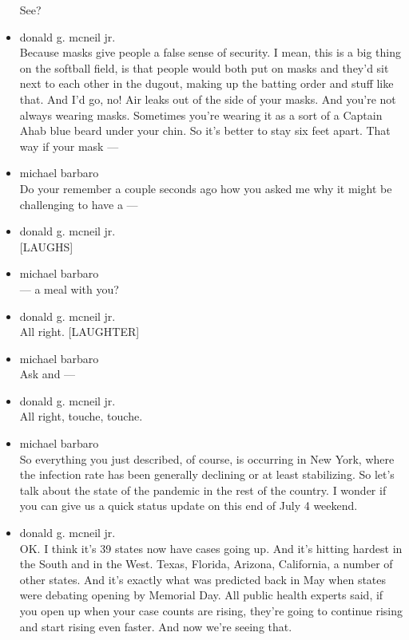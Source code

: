 \begin{itemize}
  See?
\item
  donald g. mcneil jr.\\
  Because masks give people a false sense of security. I mean, this is a
  big thing on the softball field, is that people would both put on
  masks and they'd sit next to each other in the dugout, making up the
  batting order and stuff like that. And I'd go, no! Air leaks out of
  the side of your masks. And you're not always wearing masks. Sometimes
  you're wearing it as a sort of a Captain Ahab blue beard under your
  chin. So it's better to stay six feet apart. That way if your mask ---
\item
  michael barbaro\\
  Do your remember a couple seconds ago how you asked me why it might be
  challenging to have a ---
\item
  donald g. mcneil jr.\\
  {[}LAUGHS{]}
\item
  michael barbaro\\
  --- a meal with you?
\item
  donald g. mcneil jr.\\
  All right. {[}LAUGHTER{]}
\item
  michael barbaro\\
  Ask and ---
\item
  donald g. mcneil jr.\\
  All right, touche, touche.
\item
  michael barbaro\\
  So everything you just described, of course, is occurring in New York,
  where the infection rate has been generally declining or at least
  stabilizing. So let's talk about the state of the pandemic in the rest
  of the country. I wonder if you can give us a quick status update on
  this end of July 4 weekend.
\item
  donald g. mcneil jr.\\
  OK. I think it's 39 states now have cases going up. And it's hitting
  hardest in the South and in the West. Texas, Florida, Arizona,
  California, a number of other states. And it's exactly what was
  predicted back in May when states were debating opening by Memorial
  Day. All public health experts said, if you open up when your case
  counts are rising, they're going to continue rising and start rising
  even faster. And now we're seeing that.


\end{itemize}
